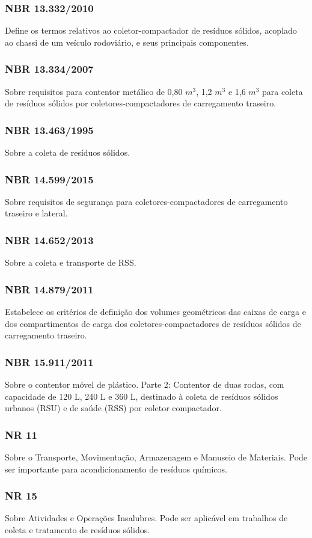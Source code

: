 \begin{subapend}
\begin{subsubapend}
		\subsubsection{NBR 13.332/2010}
		Define os termos relativos ao coletor-compactador de resíduos sólidos, acoplado ao chassi de um veículo rodoviário, e seus principais componentes.
		\subsubsection{NBR 13.334/2007}
		Sobre requisitos para contentor metálico de 0,80 $m^3$, 1,2 $m^3$ e 1,6 $m^3$ para coleta de resíduos sólidos por coletores-compactadores de carregamento traseiro.
		\subsubsection{NBR 13.463/1995}
		Sobre a coleta de resíduos sólidos.
		\subsubsection{NBR 14.599/2015}
		Sobre requisitos de segurança para coletores-compactadores de carregamento traseiro e lateral.
		\subsubsection{NBR 14.652/2013}
		Sobre a coleta e transporte de RSS.
		\subsubsection{NBR 14.879/2011}
		Estabelece os critérios de definição dos volumes geométricos das caixas de carga e dos compartimentos de carga dos coletores-compactadores de resíduos sólidos de carregamento traseiro.
		\subsubsection{NBR 15.911/2011}
		Sobre o contentor móvel de plástico. Parte 2: Contentor de duas rodas, com capacidade de 120 L, 240 L e 360 L, destinado à coleta de resíduos sólidos urbanos (RSU) e de saúde (RSS) por coletor compactador. 
		\subsubsection{NR 11}
		Sobre o Transporte, Movimentação, Armazenagem e Manuseio de Materiais. Pode ser importante para acondicionamento de resíduos químicos.
		\subsubsection{NR 15}
		Sobre Atividades e Operações Insalubres. Pode ser aplicável em trabalhos de coleta e tratamento de resíduos sólidos.

\end{subsubapend}
\end{subapend}

